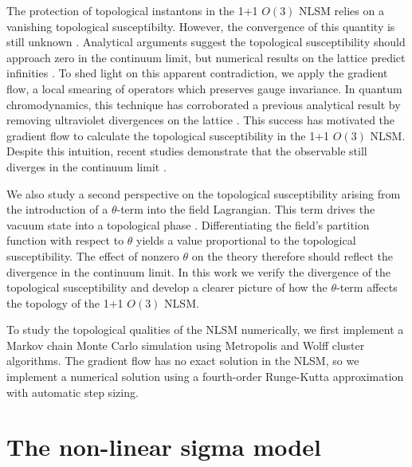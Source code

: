 \documentclass[a4paper,11pt]{article}
\begin{document}
The protection of topological instantons in the 1+1 $O(3)$ NLSM relies on a vanishing topological susceptibilty. However, the convergence of this quantity is still unknown \cite{bietenholz2018}. Analytical arguments suggest the topological susceptibility should approach zero in the continuum limit, but numerical results on the lattice predict infinities \cite{berg1981}. To shed light on this apparent contradiction, we apply the gradient flow, a local smearing of operators which preserves gauge invariance. In quantum chromodynamics, this technique has corroborated a previous analytical result \cite{giusti2004} by removing ultraviolet divergences on the lattice \cite{bruno2014}. This success has motivated the gradient flow to calculate the topological susceptibility in the 1+1 $O(3)$ NLSM. Despite this intuition, recent studies demonstrate that the observable still diverges in the continuum limit \cite{bietenholz2018}.

We also study a second perspective on the topological susceptibility arising from the introduction of a $\theta$-term into the field Lagrangian. This term drives the vacuum state into a topological phase \cite{allessalom2008}. Differentiating the field's partition function with respect to $\theta$ yields a value proportional to the topological susceptibility. The effect of nonzero $\theta$ on the theory therefore should reflect the divergence in the continuum limit. In this work we verify the divergence of the topological susceptibility and develop a clearer picture of how the $\theta$-term affects the topology of the 1+1 $O(3)$ NLSM.

To study the topological qualities of the NLSM numerically, we first implement a Markov chain Monte Carlo simulation using Metropolis and Wolff cluster \cite{wolff1989} algorithms. The gradient flow has no exact solution in the NLSM, so we implement a numerical solution using a fourth-order Runge-Kutta approximation with automatic step sizing. %

\section{The non-linear sigma model}
\label{sec:nlsm}
\end{document}
